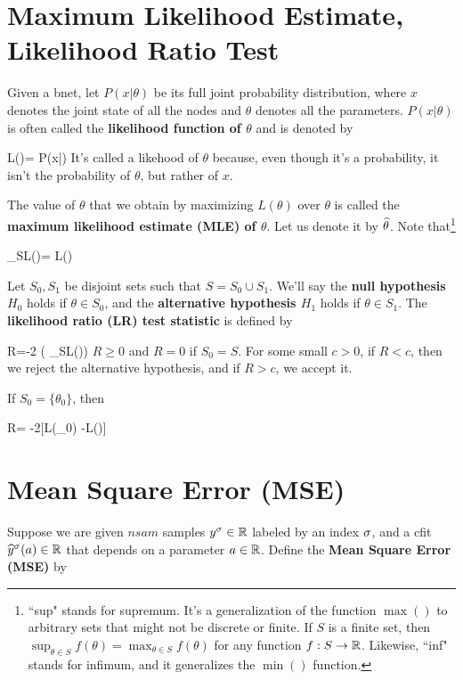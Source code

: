 \section{Maximum Likelihood Estimate,
Likelihood Ratio Test}
\label{sec0-likelihood-ratio}

Given a bnet, let $P(x|\theta)$
be its full joint probability distribution,
where
$x$ denotes the joint state
of all the nodes and $\theta$
denotes all the parameters.
 $P(x|\theta)$ is often
called the {\bf likelihood function of $\theta$}
and is denoted by

\beq
L(\theta)= P(x|\theta)
\eeq
It's called a likehood of $\theta$
because, even though it's a probability,
it isn't the probability of $\theta$,
but rather of $x$.

The value of $\theta$
that we obtain by maximizing $L(\theta)$
over $\theta$ is called
the
{\bf maximum likelihood
estimate (MLE) of $\theta$}. Let us denote it by
$\widehat{\theta}$. Note that\footnote{``sup" stands for supremum.
It's a generalization of the function $\max()$
to arbitrary sets
that might not be discrete or finite.
If $S$ is a
finite set,
then $\sup_{\theta\in S} f(\theta)=
\max_{\theta\in S} f(\theta)$
for any function $f:S\rightarrow { \mathbb{R}}$.
Likewise, ``inf" stands for infimum,
and it generalizes the $\min()$ function.}

\beq
\sup_{\theta\in S}L(\theta)=
L(\HAT{\theta})
\eeq


Let $S_0, S_1$ be disjoint sets such that
 $S=S_0\cup S_1$.
We'll say
the {\bf null hypothesis $H_0$} holds
 if $\theta\in S_0$,
and the {\bf alternative hypothesis $H_1$}
holds if
$\theta\in S_1$.
The {\bf likelihood ratio (LR) test statistic}
is defined by


\beq
R=-2\ln
\left(
{\sup_{\theta\in S}L(\theta)}\right)
\eeq
$R\geq 0$ and $R=0$ if  $S_0=S$.
For some small $c>0$,
if $R<c$, then we reject the alternative hypothesis,
and if $R>c$, we accept it.




If $S_0=\{\theta_0\}$,
then

\beq
R= -2[\ln L(\theta_0) -\ln L(\HAT{\theta})]
\eeq


\section{Mean Square Error (MSE)}

Suppose we are
given $nsam$ samples $y^\sigma\in{ \mathbb{R}}$
labeled by an index $\sigma$,
and a cfit ${\widehat{y}}^\sigma(a)\in{ \mathbb{R}}$
that depends on a parameter $a\in{ \mathbb{R}}$.
Define the {\bf Mean Square
Error (MSE)}
by

